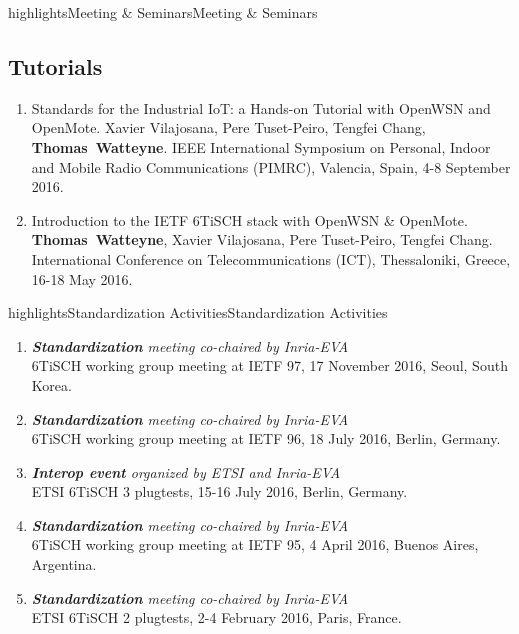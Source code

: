 \documentclass{ra2016}
\newcommand{\thomas}           {\textbf{Thomas~Watteyne}}
\begin{document}
\begin{module}{highlights}{Meeting \& Seminars}{Meeting \& Seminars}
\subsection{Tutorials}

\begin{enumerate}
    \item Standards for the Industrial IoT: a Hands-on Tutorial with OpenWSN and OpenMote.
        Xavier Vilajosana, Pere Tuset-Peiro, Tengfei Chang, \thomas. IEEE International Symposium on Personal, Indoor and Mobile Radio Communications (PIMRC), Valencia, Spain, 4-8 September 2016.
    \item Introduction to the IETF 6TiSCH stack with OpenWSN \& OpenMote.
        \thomas, Xavier Vilajosana, Pere Tuset-Peiro, Tengfei Chang. International Conference on Telecommunications (ICT), Thessaloniki, Greece, 16-18 May 2016.
\end{enumerate}

\end{module}

\begin{module}{highlights}{Standardization Activities}{Standardization Activities}

\begin{enumerate}
    \item \textit{\textbf{Standardization} meeting co-chaired by Inria-EVA}\\
        6TiSCH working group meeting at IETF 97, 17 November 2016, Seoul, South Korea.
    \item \textit{\textbf{Standardization} meeting co-chaired by Inria-EVA}\\
        6TiSCH working group meeting at IETF 96, 18 July 2016, Berlin, Germany.
    \item \textit{\textbf{Interop event} organized by ETSI and Inria-EVA}\\
        ETSI 6TiSCH 3 plugtests, 15-16 July 2016, Berlin, Germany.
    \item \textit{\textbf{Standardization} meeting co-chaired by Inria-EVA}\\
        6TiSCH working group meeting at IETF 95, 4 April 2016, Buenos Aires, Argentina.    
    \item \textit{\textbf{Standardization} meeting co-chaired by Inria-EVA}\\
        ETSI 6TiSCH 2 plugtests, 2-4 February 2016, Paris, France.
\end{enumerate}

\end{module}
\end{document}
